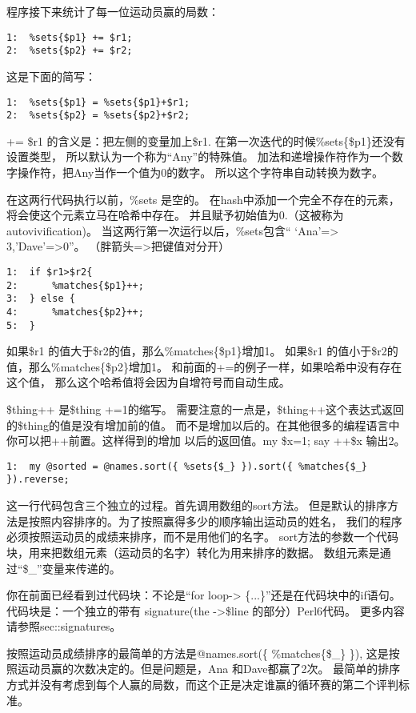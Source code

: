 \documentclass[11pt]{article}
\begin{document}
程序接下来统计了每一位运动员赢的局数：

\begin{verbatim}
1:  %sets{$p1} += $r1;
2:  %sets{$p2} += $r2;
\end{verbatim}
这是下面的简写：

\begin{verbatim}
1:  %sets{$p1} = %sets{$p1}+$r1;
2:  %sets{$p2} = %sets{$p2}+$r2;
\end{verbatim}
+= \$r1 的含义是：把左侧的变量加上\$r1.
在第一次迭代的时候\%sets\{\$p1\}还没有设置类型，
所以默认为一个称为“Any”的特殊值。
加法和递增操作符作为一个数字操作符，把Any当作一个值为0的数字。
所以这个字符串自动转换为数字。

在这两行代码执行以前，\%sets 是空的。
在hash中添加一个完全不存在的元素，将会使这个元素立马在哈希中存在。
并且赋予初始值为0.（这被称为autovivification)。
当这两行第一次运行以后，\%sets包含“ `Ana'=> 3,'Dave'=>0”。
（胖箭头=>把键值对分开）


\begin{verbatim}
1:  if $r1>$r2{
2:      %matches{$p1}++;
3:  } else {
4:      %matches{$p2}++;
5:  }
\end{verbatim}
如果\$r1 的值大于\$r2的值，那么\%matches\{\$p1\}增加1。
如果\$r1 的值小于\$r2的值，那么\%matches\{\$p2\}增加1。
和前面的+=的例子一样，如果哈希中没有存在这个值，
那么这个哈希值将会因为自增符号而自动生成。

\$thing++ 是\$thing +=1的缩写。
需要注意的一点是，\$thing++这个表达式返回的\$thing的值是没有增加前的值。
而不是增加以后的。在其他很多的编程语言中你可以把++前置。这样得到的增加
以后的返回值。my \$x=1; say ++\$x 输出2。


\begin{verbatim}
1:  my @sorted = @names.sort({ %sets{$_} }).sort({ %matches{$_} }).reverse;
\end{verbatim}

这一行代码包含三个独立的过程。首先调用数组的sort方法。
但是默认的排序方法是按照内容排序的。为了按照赢得多少的顺序输出运动员的姓名，
我们的程序必须按照运动员的成绩来排序，而不是用他们的名字。
sort方法的参数一个代码块，用来把数组元素（运动员的名字）转化为用来排序的数据。
数组元素是通过“\$\_”变量来传递的。

你在前面已经看到过代码块：不论是“for loop-> \{...\}”还是在代码块中的if语句。
代码块是：一个独立的带有 signature(the ->\$line 的部分）Perl6代码。
更多内容请参照sec::signatures。

按照运动员成绩排序的最简单的方法是@names.sort(\{ \%matches\{\$\_\} \}),
这是按照运动员赢的次数决定的。但是问题是，Ana 和Dave都赢了2次。
最简单的排序方式并没有考虑到每个人赢的局数，而这个正是决定谁赢的循环赛的第二个评判标准。
\end{document}
